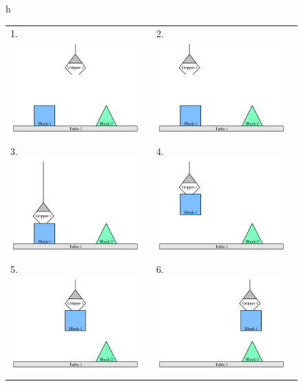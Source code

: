 \begin{figure}{h}
  \centering
  \begin{tabular}{p{5cm}p{5cm}}
    1. \includegraphics[width=5cm]{gfx/blocks_world_example-1}  & 2. \includegraphics[width=5cm]{gfx/blocks_world_example-2} \\
    3. \includegraphics[width=5cm]{gfx/blocks_world_example-3}  & 4. \includegraphics[width=5cm]{gfx/blocks_world_example-4} \\
    5. \includegraphics[width=5cm]{gfx/blocks_world_example-5}  & 6. \includegraphics[width=5cm]{gfx/blocks_world_example-6} \\

\end{tabular}
\end{figure}
